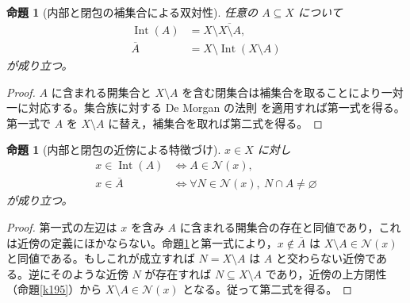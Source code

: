 \documentclass[a5paper,10pt,dvipdfmx]{jsarticle}
\theoremstyle{definition}
\theoremstyle{plain}
\newtheorem{prop}[ruledef]{命題}
\newcommand{\GenronRefText}[2]{#2}
\begin{document}
\begin{prop}[内部と閉包の補集合による双対性]\label{k200}
任意の $A\subseteq X$ について
\begin{align*}
 \operatorname{Int}(A)&=X\setminus\overline{X\setminus A},\\
 \overline A&=X\setminus\operatorname{Int}(X\setminus A)
\end{align*}
が成り立つ。
\end{prop}
\begin{proof}
$A$ に含まれる開集合と $X\setminus A$ を含む閉集合は補集合を取ることにより一対一に対応する。\GenronRefText{K-000046}{集合族に対する De Morgan の法則} を適用すれば第一式を得る。第一式で $A$ を $X\setminus A$ に替え，補集合を取れば第二式を得る。
\end{proof}
\begin{prop}[内部と閉包の近傍による特徴づけ]\label{k201}
$x\in X$ に対し
\begin{align*}
 x\in\operatorname{Int}(A)&\iff A\in\mathcal N(x),\\
 x\in\overline A&\iff
 \forall N\in\mathcal N(x),\ N\cap A\ne\varnothing
\end{align*}
が成り立つ。
\end{prop}
\begin{proof}
第一式の左辺は $x$ を含み $A$ に含まれる開集合の存在と同値であり，これは近傍の定義にほかならない。命題\ref{k200}と第一式により，$x\notin\overline A$ は $X\setminus A\in\mathcal N(x)$ と同値である。もしこれが成立すれば $N=X\setminus A$ は $A$ と交わらない近傍である。逆にそのような近傍 $N$ が存在すれば $N\subseteq X\setminus A$ であり，近傍の上方閉性（命題\ref{k195}）から $X\setminus A\in\mathcal N(x)$ となる。従って第二式を得る。
\end{proof}
\end{document}
